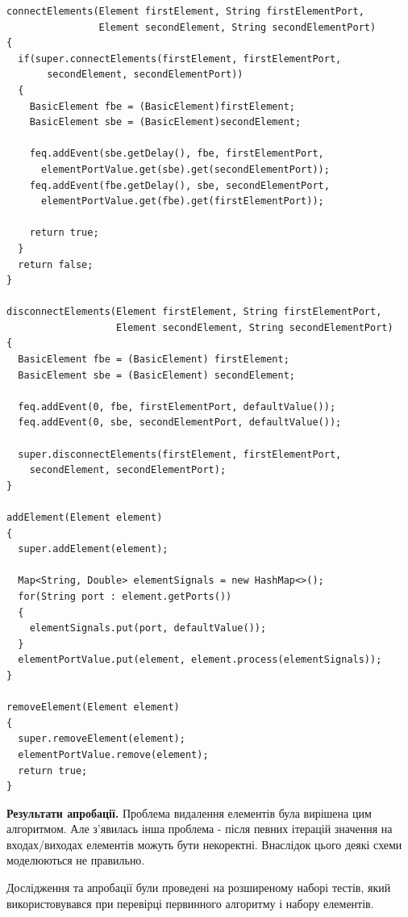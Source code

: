 \documentclass[12pt,a4paper]{article}
\begin{document}
\begin{lstlisting}
connectElements(Element firstElement, String firstElementPort,
 	            Element secondElement, String secondElementPort)
{
  if(super.connectElements(firstElement, firstElementPort,
       secondElement, secondElementPort))
  {
    BasicElement fbe = (BasicElement)firstElement;
    BasicElement sbe = (BasicElement)secondElement;

    feq.addEvent(sbe.getDelay(), fbe, firstElementPort,
      elementPortValue.get(sbe).get(secondElementPort));
    feq.addEvent(fbe.getDelay(), sbe, secondElementPort,
      elementPortValue.get(fbe).get(firstElementPort));

    return true;
  }
  return false;
}

disconnectElements(Element firstElement, String firstElementPort,
                   Element secondElement, String secondElementPort)
{
  BasicElement fbe = (BasicElement) firstElement;
  BasicElement sbe = (BasicElement) secondElement;

  feq.addEvent(0, fbe, firstElementPort, defaultValue());
  feq.addEvent(0, sbe, secondElementPort, defaultValue());

  super.disconnectElements(firstElement, firstElementPort,
    secondElement, secondElementPort);
}

addElement(Element element)
{
  super.addElement(element);

  Map<String, Double> elementSignals = new HashMap<>();
  for(String port : element.getPorts())
  {
    elementSignals.put(port, defaultValue());
  }
  elementPortValue.put(element, element.process(elementSignals));
}

removeElement(Element element)
{
  super.removeElement(element);
  elementPortValue.remove(element);
  return true;
}
\end{lstlisting}

\textbf{Результати апробації.} Проблема видалення елементів була вирішена цим алгоритмом. Але з’явилась інша проблема - після певних ітерацій значення на входах/виходах елементів можуть бути некоректні. Внаслідок цього деякі схеми моделюються не правильно.

Дослідження та апробації були проведені на розширеному наборі тестів, який використовувався при перевірці первинного алгоритму і набору елементів.


\end{document}
